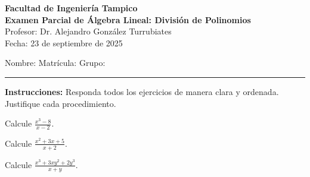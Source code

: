\documentclass[12pt]{article}
\begin{document}
\begin{center}
    \large \textbf{Facultad de Ingeniería Tampico}\\[6pt]
    \normalsize \textbf{Examen Parcial de Álgebra Lineal: División de Polinomios}\\
    \normalsize Profesor: Dr. Alejandro González Turrubiates \\[4pt]
    \normalsize Fecha: 23 de septiembre de 2025
\end{center}

\noindent
Nombre: \underline{\hspace{8cm}} Matrícula: \underline{\hspace{3cm}} Grupo: \underline{\hspace{1cm}}
\vspace{0.5cm}

\hrule
\vspace{0.5cm}

\noindent
\textbf{Instrucciones:} Responda todos los ejercicios de manera clara y ordenada. Justifique cada procedimiento.

\vspace{0.8cm}


\begin{ejercicio}
Calcule $\displaystyle \frac{x^3 - 8}{x - 2}$.
\end{ejercicio}

\vspace{3cm}

\begin{ejercicio}
Calcule $\displaystyle \frac{x^2 + 3x + 5}{x + 2}$.
\end{ejercicio}

\vspace{3cm}

\begin{ejercicio}
Calcule $\displaystyle \frac{x^3 + 3xy^2 + 2y^3}{x + y}$.
\end{ejercicio}

\vspace{3cm}
\end{document}
